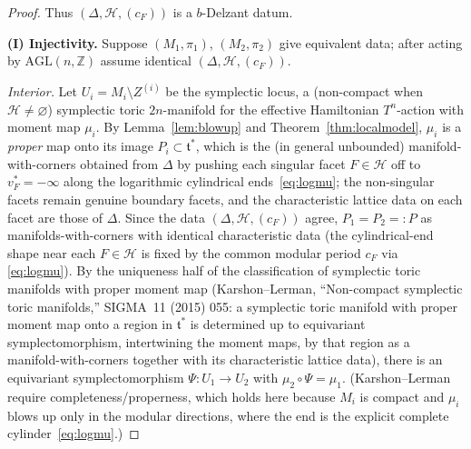\documentclass{amsart}
\theoremstyle{definition}
\begin{document}
\begin{proof}
Thus $(\Delta,\mathcal H,(c_F))$ is a $b$-Delzant datum.

\medskip
\noindent\textbf{(I) Injectivity.}
Suppose $(M_1,\pi_1)$, $(M_2,\pi_2)$ give equivalent data; after acting by
$\mathrm{AGL}(n,\mathbb Z)$ assume identical $(\Delta,\mathcal H,(c_F))$.

\emph{Interior.} Let $U_i=M_i\setminus Z^{(i)}$ be the symplectic locus, a
(non-compact when $\mathcal H\neq\varnothing$) symplectic toric $2n$-manifold for
the effective Hamiltonian $T^n$-action with moment map $\mu_i$. By
Lemma~\ref{lem:blowup} and Theorem~\ref{thm:localmodel}, $\mu_i$ is a
\emph{proper} map onto its image $P_i\subset\mathfrak t^*$, which is the (in
general unbounded) manifold-with-corners obtained from $\Delta$ by pushing each
singular facet $F\in\mathcal H$ off to $v^*_F=-\infty$ along the logarithmic
cylindrical ends~\eqref{eq:logmu}; the non-singular facets remain genuine
boundary facets, and the characteristic lattice data on each facet are those of
$\Delta$. Since the data $(\Delta,\mathcal H,(c_F))$ agree, $P_1=P_2=:P$ as
manifolds-with-corners with identical characteristic data (the cylindrical-end
shape near each $F\in\mathcal H$ is fixed by the common modular period $c_F$ via
\eqref{eq:logmu}). By the uniqueness half of the classification of symplectic
toric manifolds with proper moment map (Karshon--Lerman, ``Non-compact
symplectic toric manifolds,'' SIGMA~11 (2015) 055: a symplectic toric manifold
with proper moment map onto a region in $\mathfrak t^*$ is determined up to
equivariant symplectomorphism, intertwining the moment maps, by that region as a
manifold-with-corners together with its characteristic lattice data), there is an
equivariant symplectomorphism $\Psi\colon U_1\to U_2$ with $\mu_2\circ\Psi=\mu_1$.
(Karshon--Lerman require completeness/properness, which holds here because $M_i$
is compact and $\mu_i$ blows up only in the modular directions, where the end is
the explicit complete cylinder~\eqref{eq:logmu}.)


\end{proof}
\end{document}
